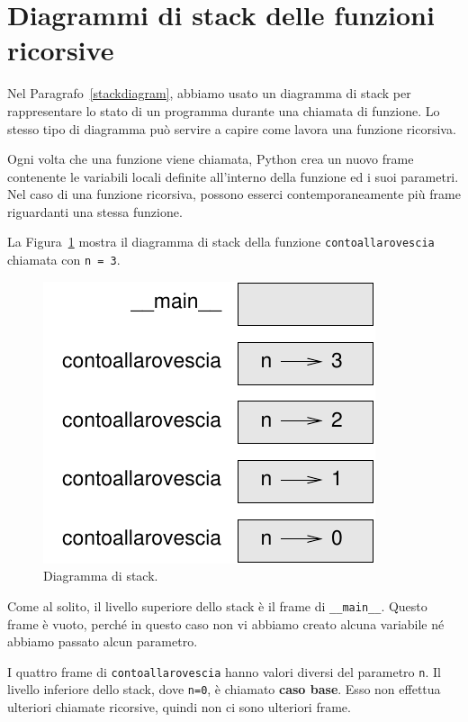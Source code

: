 \documentclass[10pt]{book}
\begin{document}
\section{Diagrammi di stack delle funzioni ricorsive}
\label{recursive.stack}

Nel Paragrafo~\ref{stackdiagram}, abbiamo usato un diagramma di stack per   rappresentare lo stato di un programma durante una chiamata di funzione. Lo stesso tipo di diagramma può servire a capire come lavora una funzione ricorsiva.

Ogni volta che una funzione viene chiamata, Python crea un nuovo frame contenente le variabili locali definite all'interno della funzione ed i suoi parametri. Nel caso di una funzione ricorsiva, possono esserci contemporaneamente più frame riguardanti una stessa funzione.

La Figura~\ref{fig.stack2} mostra il diagramma di stack della funzione {\tt contoallarovescia} chiamata con {\tt n = 3}.

\begin{figure}
\centerline
{\includegraphics[scale=0.8]{figs/stack2.pdf}}
\caption{Diagramma di stack.}
\label{fig.stack2}
\end{figure}


Come al solito, il livello superiore dello stack è il frame di \verb"__main__".
Questo frame è vuoto, perché in questo caso non vi abbiamo creato alcuna variabile né abbiamo passato alcun parametro.

I quattro frame di {\tt contoallarovescia} hanno valori diversi del parametro {\tt n}. Il livello inferiore dello stack, dove {\tt n=0}, è chiamato {\bf caso base}. Esso non effettua ulteriori chiamate ricorsive, quindi non ci sono ulteriori frame.
\end{document}
